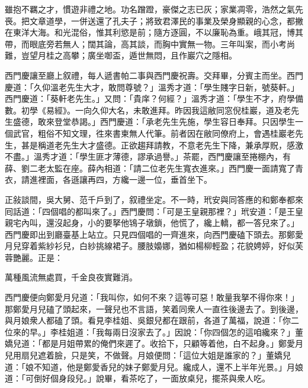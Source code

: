 \begin{myquote} 
雖抱不羈之才，慣遊非禮之地。功名蹭蹬，豪傑之志已灰；家業凋零，浩然之氣先䘮。把文章道學，一併送還了孔夫子；將致君澤民的事業及榮身顯親的心念，都撇在東洋大海。和光混俗，惟其利慾是前；隨方逐圓，不以廉恥為重。峨其冠，博其帶，而眼底旁若無人；闊其論，高其談，而胸中實無一物。三年叫案，而小考尚難，豈望月桂之高攀；廣坐啣盃，遁世無悶，且作巖穴之隱相。
\end{myquote} 

西門慶讓至廳上叙禮，每人遞書帕二事與西門慶祝壽。交拜畢，分賓主而坐。西門慶道：「久仰溫老先生大才，敢問尊號？」溫秀才道：「學生賤字日新，號葵軒。」西門慶道：「葵軒老先生。」又問：「貴庠？何經？」溫秀才道：「學生不才，府學備數。初學《易經》。{}一向久仰大名，未敢進拜。昨因我這敝同窓倪桂巖，道及老先生盛德，敢來登堂恭謁。」西門慶道：「承老先生先施，學生容日奉拜。只因學生一個武官，粗俗不知文理，徃來書柬無人代筆。前者因在敝同僚府上，會遇桂巖老先生，甚是稱道老先生大才盛德。正欲趨拜請教，不意老先生下降，兼承厚貺，感激不盡。」溫秀才道：「學生匪才薄德，謬承過譽。」茶罷，西門慶讓至捲棚內，有薛、劉二老太監在座。薛內相道：「請二位老先生寬衣進來。」西門慶一面請寬了青衣，請進裡面，各遜讓再四，方纔一邊一位，垂首坐下。

正敍談間，吳大舅、范千戶到了，叙禮坐定。不一時，玳安與同答應的和鄭奉都來囘話道：「四個唱的都叫來了。」西門慶問：「可是王皇親那裡？」玳安道：「是王皇親宅內叫，還沒起身，小的要拏他鴇子墩鎖，他慌了，纔上轎，都一答兒來了。」西門慶即出到廳臺基上站立。只見四個唱的一齊進來，向西門慶磕下頭去。那鄭愛月兒穿着紫紗衫兒，白紗挑線裙子。腰肢嬝娜，猶如楊柳輕盈；花貌娉婷，好似芙蓉艷麗。正是：

\begin{myquote} 
萬種風流無處買，千金良夜實難消。
\end{myquote} 

西門慶便向鄭愛月兒道：「我叫你，如何不來？這等可惡！敢量我拏不得你來！」那鄭愛月兒磕了頭起來，一聲兒也不言語，笑着同衆人一直徃後邊去了。{}到後邊，與月娘衆人都磕了頭。看見李桂姐、吳銀兒都在跟前，各道了萬福，說道：「你二位來的早。」李桂姐道：「我每兩日沒家去了。」因說：「你四個怎的這咱纔來？」董嬌兒道：「都是月姐帶累的俺們來遲了。收拾下，只顧等着他，白不起身。」鄭愛月兒用扇兒遮着臉，只是笑，不做聲。月娘便問：「這位大姐是誰家的？」董嬌兒道：「娘不知道，他是鄭愛香兒的妹子鄭愛月兒。纔成人，還不上半年光景。」月娘道：「可倒好個身段兒。」說畢，看茶吃了，一面放桌兒，擺茶與衆人吃。

